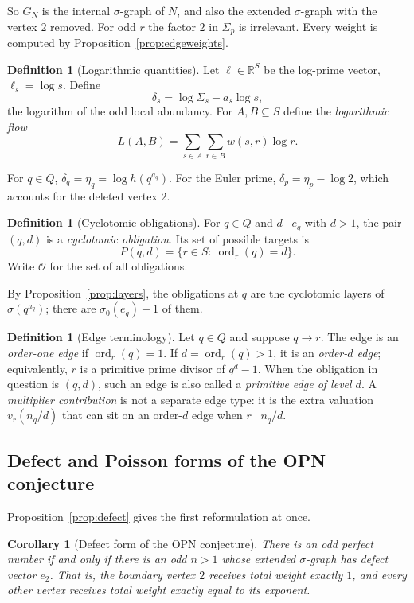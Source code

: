 \documentclass[11pt]{article}
\newtheorem{corollary}[theorem]{Corollary}
\theoremstyle{definition}
\newtheorem{definition}[theorem]{Definition}
\theoremstyle{remark}
\DeclareMathOperator{\ord}{ord}
\newcommand{\R}{\mathbb{R}}
\begin{document}
So $G_N$ is the internal $\sigma$-graph of $N$, and also the extended
$\sigma$-graph with the vertex $2$ removed.  For odd $r$ the factor $2$ in
$\Sigma_p$ is irrelevant.  Every weight is computed by
Proposition~\ref{prop:edgeweights}.

\begin{definition}[Logarithmic quantities]
Let $\ell\in\R^S$ be the log-prime vector, $\ell_s=\log s$.  Define
\[
\delta_s=\log\Sigma_s-a_s\log s,
\]
the logarithm of the odd local abundancy.  For $A,B\subseteq S$ define the
\emph{logarithmic flow}
\[
L(A,B)=\sum_{s\in A}\sum_{r\in B}w(s,r)\log r .
\]
\end{definition}

For $q\in Q$, $\delta_q=\eta_q=\log h(q^{a_q})$.  For the Euler prime,
$\delta_p=\eta_p-\log2$, which accounts for the deleted vertex $2$.

\begin{definition}[Cyclotomic obligations]
For $q\in Q$ and $d\mid e_q$ with $d>1$, the pair $(q,d)$ is a
\emph{cyclotomic obligation}.  Its set of possible targets is
\[
P(q,d)=\{r\in S:\ \ord_r(q)=d\}.
\]
Write $\mathcal O$ for the set of all obligations.
\end{definition}

By Proposition~\ref{prop:layers}, the obligations at $q$ are the cyclotomic
layers of $\sigma(q^{a_q})$; there are $\sigma_0(e_q)-1$ of them.

\begin{definition}[Edge terminology]
Let $q\in Q$ and suppose $q\to r$.  The edge is an \emph{order-one edge}
if $\ord_r(q)=1$.  If $d=\ord_r(q)>1$, it is an \emph{order-$d$ edge};
equivalently, $r$ is a primitive prime divisor of $q^d-1$.  When the
obligation in question is $(q,d)$, such an edge is also called a
\emph{primitive edge of level $d$}.  A \emph{multiplier contribution} is not
a separate edge type: it is the extra valuation $v_r(n_q/d)$ that can sit on
an order-$d$ edge when $r\mid n_q/d$.
\end{definition}

\subsection{Defect and Poisson forms of the OPN conjecture}\label{sec:poisson}

Proposition~\ref{prop:defect} gives the first reformulation at once.

\begin{corollary}[Defect form of the OPN conjecture]\label{cor:defect}
There is an odd perfect number if and only if there is an odd $n>1$ whose
extended $\sigma$-graph has defect vector $e_2$.  That is, the boundary
vertex $2$ receives total weight exactly $1$, and every other vertex receives
total weight exactly equal to its exponent.
\end{corollary}
\end{document}
